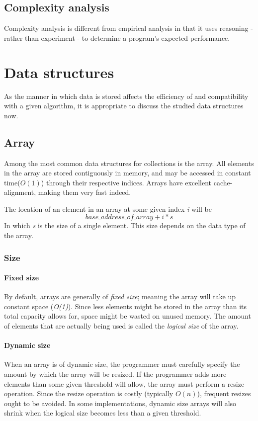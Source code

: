 \documentclass{article}
\begin{document}
\subsection{Complexity analysis}
Complexity analysis is different from empirical analysis in that it uses reasoning
- rather than experiment - to determine a program's expected performance.


\newpage


\section{Data structures}
As the manner in which data is stored affects the efficiency of and compatibility with a given algorithm,
it is appropriate to discuss the studied data structures now.


\subsection{Array}
Among the most common data structures for collections is the array.
All elements in the array are stored contiguously in memory,
and may be accessed in constant time(\(O(1)\)) through their respective indices.
Arrays have excellent cache-alignment, making them very fast indeed.

The location of an element in an array at some given index {\em i} will be
\[base\_address\_of\_array + i * s\]
In which {\em s} is the size of a single element.
This size depends on the data type of the array.

\subsubsection{Size}

\paragraph{Fixed size}
By default, arrays are generally of {\em fixed size}; meaning the array will take up constant space ({\em O(1)}).
Since less elements might be stored in the array than its total capacity allows for,
space might be wasted on unused memory. The amount of elements that are actually being used is
called the {\em logical size} of the array.

\paragraph{Dynamic size}
When an array is of dynamic size, the programmer must carefully specify the amount by
which the array will be resized. If the programmer adds more elements than some given threshold will allow,
the array must perform a resize operation. Since the resize operation is costly (typically \(O(n)\)),
frequent resizes ought to be avoided. In some implementations, dynamic size arrays will also shrink when
the logical size becomes less than a given threshold.
\end{document}
